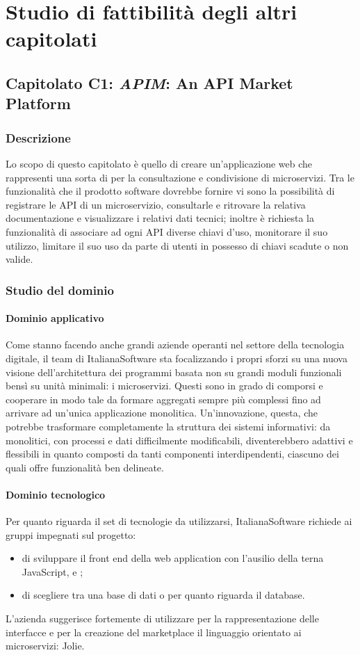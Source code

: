 \newpage

\section{Studio di fattibilità degli altri capitolati}
	\subsection{Capitolato C1: \emph{APIM}: An API Market Platform}
		\subsubsection{Descrizione}
		Lo scopo di questo capitolato è quello di creare un'applicazione web che rappresenti una sorta di  per la consultazione e 
		condivisione di microservizi. Tra le funzionalità che il prodotto software dovrebbe fornire vi sono la possibilità di registrare le API 
		di un microservizio, consultarle e ritrovare la relativa documentazione e visualizzare i relativi dati tecnici; inoltre è richiesta la 
		funzionalità di associare ad ogni API diverse chiavi d'uso, monitorare il suo utilizzo, limitare il suo uso da parte di utenti in possesso 
		di chiavi scadute o non valide.
		\subsubsection{Studio del dominio}
			\paragraph{Dominio applicativo}
			Come stanno facendo anche grandi aziende operanti nel settore della tecnologia digitale, il team di ItalianaSoftware sta focalizzando i propri sforzi su una nuova visione dell'architettura dei programmi basata non su grandi moduli funzionali bensì su unità minimali: i microservizi. Questi sono in grado di comporsi e cooperare in modo tale da formare aggregati sempre più complessi fino ad arrivare ad un'unica applicazione monolitica. Un'innovazione, questa, che potrebbe trasformare completamente la struttura dei sistemi informativi: da monolitici, con processi e dati difficilmente modificabili, diventerebbero adattivi e flessibili in quanto composti da tanti componenti interdipendenti, ciascuno dei quali offre funzionalità ben delineate.
			\paragraph{Dominio tecnologico}
			Per quanto riguarda il set di tecnologie da utilizzarsi, ItalianaSoftware richiede ai gruppi impegnati sul progetto:
			\begin{itemize}
			\item di sviluppare il front end della web application con l'ausilio della terna JavaScript,  e ;
			\item di scegliere tra una base di dati  o  per quanto riguarda il database.
			\end{itemize}
			L'azienda suggerisce fortemente di utilizzare per la rappresentazione delle interfacce e per la creazione del marketplace
			il linguaggio orientato ai microservizi: Jolie.
